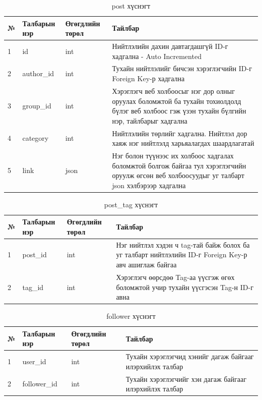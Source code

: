 \begin{table}[h]
	\caption{post хүснэгт}
	\begin{tabular}{|l|l|l|p{8cm}|}
	\hline
	№ &  Талбарын нэр & Өгөгдлийн төрөл & Тайлбар \\ \hline
	1 &  id & int & Нийтлэлийн дахин давтагдашгүй ID-г хадгална - Auto Incremented \\ \hline
	2 &  author\_id & int & Тухайн нийтлэлийг бичсэн хэрэглэгчийн ID-г Foreign Key-р хадгална \\ \hline
	3 &  group\_id & int & Хэрэглэгч веб холбоосыг нэг дор олныг оруулах боломжтой ба тухайн тохиолдолд бүлэг веб холбоос гэж үзэн тухайн бүлгийн нэр, тайлбарыг хадгална \\ \hline
	4 &  category & int & Нийтлэлийн төрлийг хадгална. Нийтлэл дор хаяж нэг нийтлэлд харьяалагдах шаардлагатай \\ \hline
	5 &  link & json & Нэг болон түүнээс их холбоос хадгалах боломжтой болгож байгаа тул хэрэглэгчийн оруулж өгсөн веб холбоосуудыг уг талбарт json хэлбэрээр хадгална \\ \hline

\end{tabular}
\end{table}

\begin{table}[h]
	\caption{post\_tag хүснэгт}
	\begin{tabular}{|l|l|l|p{8cm}|}
	\hline
	№ &  Талбарын нэр & Өгөгдлийн төрөл & Тайлбар \\ \hline
	1 &  post\_id & int & Нэг нийтлэл хэдэн ч tag-тай байж болох ба уг талбарт нийтлэлийн ID-г Foreign Key-р авч ашиглаж байгаа \\ \hline
	2 &  tag\_id & int & Хэрэглэгч өөрсдөө Tag-аа үүсгэж өгөх боломжтой учир тухайн үүсгэсэн Tag-н ID-г авна \\ \hline

\end{tabular}
\end{table}

\begin{table}[h]
	\caption{follower хүснэгт}
	\begin{tabular}{|l|l|l|p{8cm}|}
	\hline
	№ &  Талбарын нэр & Өгөгдлийн төрөл & Тайлбар \\ \hline
	1 &  user\_id & int & Тухайн хэрэглэгчид хэнийг дагаж байгааг илэрхийлэх талбар \\ \hline
	2 &  follower\_id & int & Тухайн хэрэглэгчийг хэн дагаж байгааг илэрхийлэх талбар \\ \hline

\end{tabular}
\end{table}


